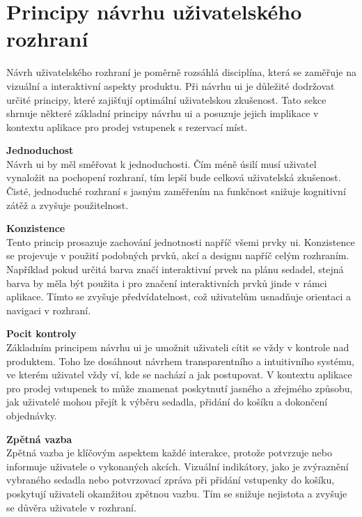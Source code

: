 \section{Principy návrhu uživatelského rozhraní}
\label{sec:navrh-uzivatelskeho-rozhrani-principy}
Návrh uživatelského rozhraní je poměrně rozsáhlá disciplína, která se zaměřuje na vizuální a interaktivní aspekty produktu.
Při návrhu \ac{ui} je důležité dodržovat určité principy, které zajišťují optimální uživatelskou zkušenost.
Tato sekce shrnuje některé základní principy návrhu \ac{ui} a posuzuje jejich implikace v kontextu aplikace pro prodej vstupenek s rezervací míst.

\textbf{Jednoduchost}\\
Návrh \ac{ui} by měl směřovat k jednoduchosti.
Čím méně úsilí musí uživatel vynaložit na pochopení rozhraní, tím lepší bude celková uživatelská zkušenost.
Čisté, jednoduché rozhraní s jasným zaměřením na funkčnost snižuje kognitivní zátěž a zvyšuje použitelnost\cite{d_resources_ui_design_principles}.

\textbf{Konzistence}\\
Tento princip prosazuje zachování jednotnosti napříč všemi prvky \ac{ui}.
Konzistence se projevuje v použití podobných prvků, akcí a designu napříč celým rozhraním\cite{d_resources_ui_design_principles}.
Například pokud určitá barva značí interaktivní prvek na plánu sedadel, stejná barva by měla být použita i pro značení interaktivních prvků jinde v rámci aplikace.
Tímto se zvyšuje předvídatelnost, což uživatelům usnadňuje orientaci a navigaci v rozhraní.

\textbf{Pocit kontroly}\\
Základním principem návrhu \ac{ui} je umožnit uživateli cítit se vždy v kontrole nad produktem.
Toho lze dosáhnout návrhem transparentního a intuitivního systému, ve kterém uživatel vždy ví, kde se nachází a jak postupovat\cite{d_resources_ui_design_principles}.
V kontextu aplikace pro prodej vstupenek to může znamenat poskytnutí jasného a zřejmého způsobu, jak uživatelé mohou přejít k výběru sedadla, přidání do košíku a dokončení objednávky.

\textbf{Zpětná vazba}\\
Zpětná vazba je klíčovým aspektem každé interakce, protože potvrzuje nebo informuje  uživatele o vykonaných akcích\cite{d_resources_ui_design_principles}.
Vizuální indikátory, jako je zvýraznění vybraného sedadla nebo potvrzovací zpráva při přidání vstupenky do košíku, poskytují uživateli okamžitou zpětnou vazbu.
Tím se snižuje nejistota a zvyšuje se důvěra uživatele v rozhraní.

